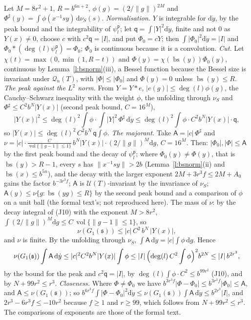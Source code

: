 \documentclass[11pt,a4paper]{article}
\makeatletter
\theoremstyle{plainx}
\theoremstyle{uprightx}
\renewenvironment{proof}[1][Proof]{\par\pushQED{\qed}\normalfont\topsep0pt\partopsep0pt
  \trivlist\item[\hskip\labelsep\itshape #1.]\ignorespaces}{\popQED\endtrivlist\@endpefalse}
\newcommand{\dd}{\mathrm{d}}
\newcommand{\Ql}[2]{\mathcal{Q}_{#1}(#2)}
\newcommand{\UT}[1]{\mathcal{U}(#1)}
\newcommand{\vol}{\operatorname{vol}}
\newcommand{\Gone}[1]{G_1(#1)}
\newcommand{\Inp}[1]{\textup{(#1)}}
\newcommand{\bs}[1]{\operatorname{bs}(#1)}
\makeatother
\begin{document}
\begin{proof}[Proof of Theorem D\textup{(ii)}]
Let $M=8r^{2}+1$, $R=b^{6n+2}$, $\phi(g)=(2/\|g\|)^{2M}$ and
$\Phi^{\sharp}(y)=\int\phi(x^{-1}sy)\,\dd\nu_S(s)$. \emph{Normalisation.} $Y$ is integrable for $\dd\dot y$, by the
peak bound and the integrability of $\psi^{\mathsf{p}}_l$; let $\mathsf{q}=\int|Y|^{2}\dd\dot y$, finite and not $0$ as
$Y(x)\ne0$, choose $c$ with $c^{2}\mathsf{q}=|I|$, and put $\Phi_0=cY$; then $\int|\Phi_0|^{2}\dd\dot y=|I|$ and
$\Phi_0*(\deg(l)\psi^{\mathsf{p}}_l)=\Phi_0$; $\Phi_0$ is continuous because it is a convolution. \emph{Cut.} Let
$\chi(t)=\max(0,\min(1,R-t))$ and $\Phi(y)=\chi(\bs{y})\Phi_0(y)$, continuous by Lemma~\ref{l:bsnorm}(iii), a Bessel
function because the Bessel size is invariant under $\Ql{n}{T}$, with $|\Phi|\le|\Phi_0|$ and $\Phi(y)=0$ unless
$\bs{y}\le R$. \emph{The peak against the $L^{2}$ norm.} From $Y=Y*e$, $|e(g)|\le\deg(l)\phi(g)$, the Cauchy--Schwarz
inequality with the weight $\phi$, the unfolding through $\nu_S$ and $\Phi^{\sharp}\le C^{2}b^{N}|Y(x)|$ (second
peak bound, $C=16^{M}$),
\[|Y(x)|^{2}\le\deg(l)^{2}\int\phi\cdot\int|Y|^{2}\,\Phi^{\sharp}\,\dd\dot y\le\deg(l)^{2}\int\phi\cdot C^{2}b^{N}|Y(x)|\cdot\mathsf{q},\]
so $|Y(x)|\le\deg(l)^{2}\,C^{2}b^{N}\,\mathsf{q}\int\phi$.
\emph{The majorant.} Take $\mathsf{A}=|c|\,\Phi^{\sharp}$ and
$\nu=|c|\cdot\frac{C}{\vol\{\|g-1\|\le1\}}\,b^{N}|Y(x)|\cdot(2/\|g\|)^{M}\dd g$, $C=16^{M}$. Then:
$|\Phi_0|,|\Phi|\le\mathsf{A}$ by the first peak bound and the decay of $\psi^{\mathsf{p}}_l$; where $\Phi_0(y)\ne\Phi(y)$,
that is $\bs{y}>R-1$, every $s$ has $\|x^{-1}sy\|>2b$ (Lemma~\ref{l:bsnorm}(ii) and $\bs{x}\le b^{5n}$), and the
decay with the larger exponent $2M+3r^{3}f\le2M+A_0$ gains the factor $b^{-3r^{3}f}$; $\mathsf{A}$ is
$\UT{T}$-invariant by the invariance of $\nu_S$; $\mathsf{A}(y)\le\nu\{g:\bs{yg}\le R\}$ by the second peak bound
and a comparison of $\phi$ on a unit ball (the formal text's; not reproduced here). The mass of $\nu$: by the decay
integral of \Inp{J10} with the exponent $M>8r^{2}$, $\int(2/\|g\|)^{M}\dd g\le C\,\vol\{\|g-1\|\le1\}$, so
\[\nu(\Gone{\mathfrak{s}})\le|c|\,C^{2}\,b^{N}\,|Y(x)|,\]
and $\nu$ is finite. By the unfolding through $\nu_S$, $\int\mathsf{A}\,\dd\dot y=|c|\int\phi\,\dd g$. Hence
\[\nu(\Gone{\mathfrak{s}})\int\mathsf{A}\,\dd\dot y\le|c|^{2}C^{2}b^{N}|Y(x)|\int\phi\le|I|\,\Bigl(\deg(l)\,C^{2}\int\phi\Bigr)^{2}b^{2N}
\le|I|\,b^{2r^{3}},\]
by the bound for the peak and $c^{2}\mathsf{q}=|I|$, by $\deg(l)\int\phi\cdot C^{2}\le b^{99r^{2}}$ \Inp{J10}, and by
$N+99r^{2}\le r^{3}$. \emph{Closeness.} Where $\Phi\ne\Phi_0$ we have $b^{3r^{3}f}|\Phi-\Phi_0|\le b^{3r^{3}f}|\Phi_0|\le
\mathsf{A}$, and $\mathsf{A}\le\nu(\Gone{\mathfrak{s}})$; so
$b^{6r^{3}f}\int|\Phi-\Phi_0|^{2}\dd\dot y\le\nu(\Gone{\mathfrak{s}})\int\mathsf{A}\,\dd\dot y\le b^{2r^{3}}|I|$, and
$2r^{3}-6r^{3}f\le-10r^{2}$ because $f\ge1$ and $r\ge99$, which follows from $N+99r^{2}\le r^{3}$. The comparisons of exponents are those of the formal text.
\end{proof}
\end{document}
